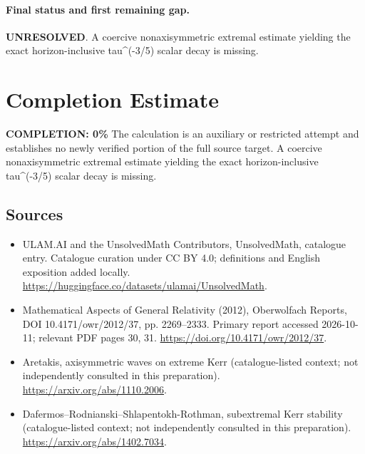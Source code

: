 \documentclass[11pt]{article}
\begin{document}
\paragraph{Final status and first remaining gap.}
\textbf{UNRESOLVED}. A coercive nonaxisymmetric extremal estimate yielding the exact horizon-inclusive tau\textasciicircum{}(-3/5) scalar decay is missing.

\section{Completion Estimate}
\noindent\textbf{COMPLETION: 0\%}
The calculation is an auxiliary or restricted attempt and establishes no newly verified portion of the full source target. A coercive nonaxisymmetric extremal estimate yielding the exact horizon-inclusive tau\textasciicircum{}(-3/5) scalar decay is missing.

\subsection{Sources}
\begin{itemize}
\item[\hypertarget{source:statement:1}{S1}] ULAM.AI and the UnsolvedMath Contributors, UnsolvedMath, catalogue entry. Catalogue curation under CC BY 4.0; definitions and English exposition added locally.
\url{https://huggingface.co/datasets/ulamai/UnsolvedMath}.
\item[\hypertarget{source:statement:2}{S2}] Mathematical Aspects of General Relativity (2012), Oberwolfach Reports, DOI 10.4171/owr/2012/37, pp. 2269--2333. Primary report accessed 2026-10-11; relevant PDF pages 30, 31.
\url{https://doi.org/10.4171/owr/2012/37}.
\item[\hypertarget{source:statement:3}{S3}] Aretakis, axisymmetric waves on extreme Kerr (catalogue-listed context; not independently consulted in this preparation).
\url{https://arxiv.org/abs/1110.2006}.
\item[\hypertarget{source:statement:4}{S4}] Dafermos--Rodnianski--Shlapentokh-Rothman, subextremal Kerr stability (catalogue-listed context; not independently consulted in this preparation).
\url{https://arxiv.org/abs/1402.7034}.
\end{itemize}
\label{end:statement}
\end{document}
